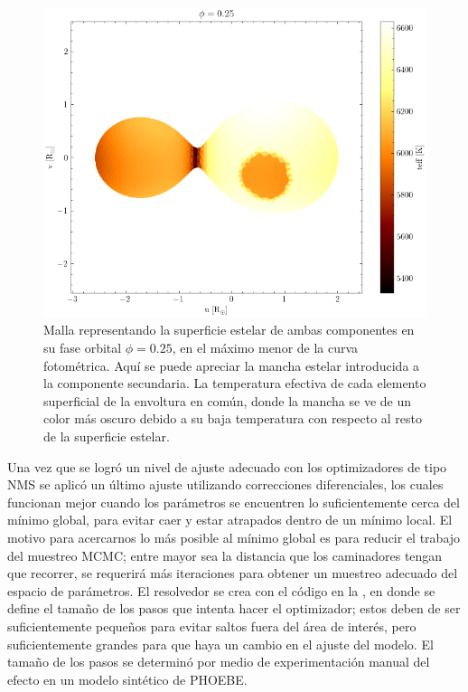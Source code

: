 \begin{figure}[!ht]
	\centering
	\includegraphics[scale=0.8]{Metodologia/Secciones/ModeloComputacional/Figures/Figura Malla Mancha NM.png}
	\caption{Malla representando la superficie estelar de ambas componentes en
	su fase orbital $\phi = 0.25$, en el máximo menor de la curva fotométrica.
	Aquí se puede apreciar la mancha estelar introducida a la componente
	secundaria. La temperatura efectiva de cada elemento superficial de la
	envoltura en común, donde la mancha se ve de un color más oscuro debido a su
	baja temperatura con respecto al resto de la superficie estelar.}
	\label{figuraMallaManchaNm}
\end{figure}

Una vez que se logró un nivel de ajuste adecuado con los optimizadores
de tipo NMS se aplicó un último ajuste utilizando correcciones diferenciales,
los cuales funcionan mejor cuando los parámetros se encuentren lo
suficientemente cerca del mínimo global, para evitar caer y estar atrapados
dentro de un mínimo local. El motivo para acercarnos lo más posible al mínimo
global es para reducir el trabajo del muestreo MCMC; entre mayor sea la
distancia que los caminadores tengan que recorrer, se requerirá más iteraciones
para obtener un muestreo adecuado del espacio de parámetros. El resolvedor se
crea con el código en la , en donde se define el
tamaño de los pasos que intenta hacer el optimizador; estos deben de ser
suficientemente pequeños para evitar saltos fuera del área de interés, pero
suficientemente grandes para que haya un cambio en el ajuste del modelo. El
tamaño de los pasos se determinó por medio de experimentación manual del efecto
en un modelo sintético de PHOEBE.

